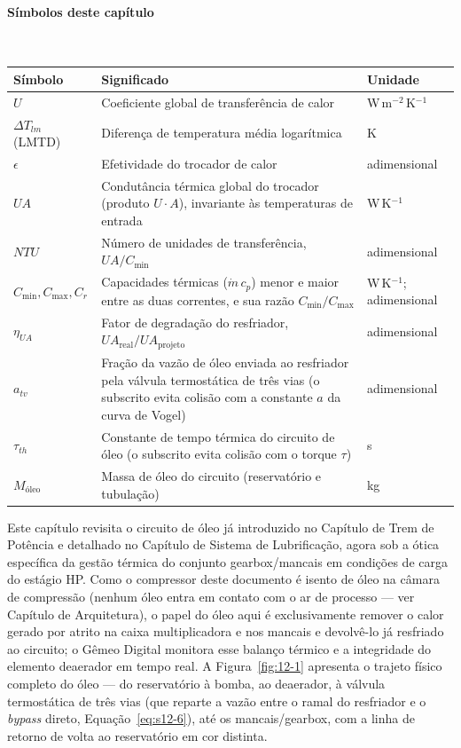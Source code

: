 \documentclass[12pt,a4paper]{article}
\numberwithin{equation}{section}
\numberwithin{table}{section}
\numberwithin{figure}{section}
\begin{document}
{\paragraph{Símbolos deste capítulo}\mbox{}\\[-0.5em]
{\small
\begin{longtable}{>{\raggedright\arraybackslash}p{2.6cm} >{\raggedright\arraybackslash}p{9.2cm} >{\raggedright\arraybackslash}p{2.6cm}}
	\toprule
	\textbf{Símbolo} & \textbf{Significado} & \textbf{Unidade} \\ \midrule
	\endhead
	$U$ & Coeficiente global de transferência de calor & W\,m$^{-2}$\,K$^{-1}$ \\
	$\Delta T_{lm}$ (LMTD) & Diferença de temperatura média logarítmica & K \\
	$\epsilon$ & Efetividade do trocador de calor & adimensional \\
	$UA$ & Condutância térmica global do trocador (produto $U \cdot A$), invariante às temperaturas de entrada & W\,K$^{-1}$ \\
	$NTU$ & Número de unidades de transferência, $UA/C_{\min}$ & adimensional \\
	$C_{\min}, C_{\max}, C_r$ & Capacidades térmicas ($\dot{m}\,c_p$) menor e maior entre as duas correntes, e sua razão $C_{\min}/C_{\max}$ & W\,K$^{-1}$; adimensional \\
	$\eta_{UA}$ & Fator de degradação do resfriador, $UA_{\text{real}}/UA_{\text{projeto}}$ & adimensional \\
	$a_{tv}$\dag & Fração da vazão de óleo enviada ao resfriador pela válvula termostática de três vias (o subscrito evita colisão com a constante $a$ da curva de Vogel) & adimensional \\
	$\tau_{th}$\dag & Constante de tempo térmica do circuito de óleo (o subscrito evita colisão com o torque $\tau$) & s \\
	$M_{\text{óleo}}$ & Massa de óleo do circuito (reservatório e tubulação) & kg \\
	\bottomrule
\end{longtable}
}





	Este capítulo revisita o circuito de óleo já introduzido no Capítulo de Trem de Potência e detalhado no Capítulo de Sistema de Lubrificação, agora sob a ótica específica da gestão térmica do conjunto gearbox/mancais em condições de carga do estágio HP. Como o compressor deste documento é isento de óleo na câmara de compressão (nenhum óleo entra em contato com o ar de processo — ver Capítulo de Arquitetura), o papel do óleo aqui é exclusivamente remover o calor gerado por atrito na caixa multiplicadora e nos mancais e devolvê-lo já resfriado ao circuito; o Gêmeo Digital monitora esse balanço térmico e a integridade do elemento deaerador em tempo real. A Figura~\ref{fig:12-1} apresenta o trajeto físico completo do óleo — do reservatório à bomba, ao deaerador, à válvula termostática de três vias (que reparte a vazão entre o ramal do resfriador e o \textit{bypass} direto, Equação~\eqref{eq:s12-6}), até os mancais/gearbox, com a linha de retorno de volta ao reservatório em cor distinta.

}
\end{document}
